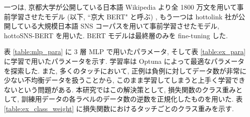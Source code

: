 \newpage

一つは, 京都大学が公開している日本語 Wikipedia より全 1800 万文を用いて事前学習させたモデル \cite{kyoto-bert} (以下, ``京大 BERT" と呼ぶ) , もう一つは hottolink 社が公開している大規模日本語 SNS コーパスを用いて事前学習させたモデル, hottoSNS-BERT \cite{hottoSNS-bert} を用いた. BERT モデルは最終層のみを fine-tuning した.

表 \ref{table:mlp_para} に 3 層 MLP で用いたパラメータ, そして表 \ref{table:ex_para} に学習で用いたパラメータを示す. 学習率は Optuna \cite{optuna_2019} によって最適なパラメータを探索した.
また, 多くのタッチにおいて, 正例は負例に対してデータ数が非常に少ない不均衡データを扱うことから, このまま学習してしまうと上手く学習できないという問題がある. 本研究ではこの解決策として, 損失関数のクラス重みとして, 訓練用データの各ラベルのデータ数の逆数を正規化したものを用いた. 表 \ref{table:ex_class_weight} に損失関数におけるタッチごとのクラス重みを示す.

\begin{table}[!h]
\vspace{20mm}
\caption{各実験における MLP のパラメータ}
\label{table:mlp_para}
\centering
{}
\end{table}

\newpage

\begin{table}[!h]
\vspace{10mm}
\caption{学習パラメータ}
\label{table:ex_para}
\centering
{}
\vspace{10mm}
\end{table}

